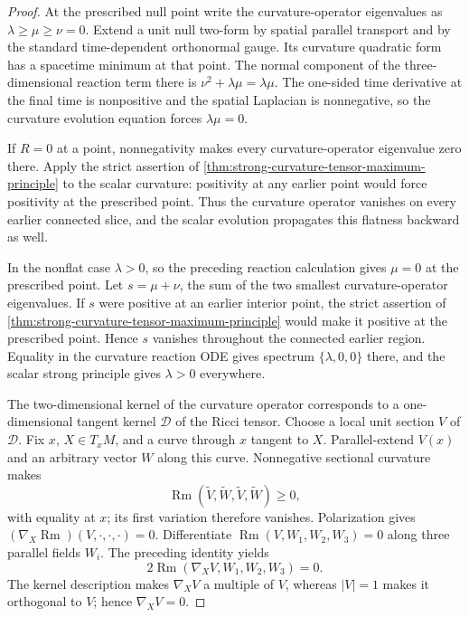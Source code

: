 \begin{proof}
At the prescribed null point write the curvature-operator eigenvalues as
$\lambda\ge\mu\ge\nu=0$.  Extend a unit null two-form by spatial parallel
transport and by the standard time-dependent orthonormal gauge.  Its
curvature quadratic form has a spacetime minimum at that point.  The normal
component of the three-dimensional reaction term there is
$\nu^2+\lambda\mu=\lambda\mu$.  The one-sided time derivative at the final
time is nonpositive and the spatial Laplacian is nonnegative, so the
curvature evolution equation forces $\lambda\mu=0$.

If $R=0$ at a point, nonnegativity makes every curvature-operator eigenvalue
zero there.  Apply the strict assertion of
\ref{thm:strong-curvature-tensor-maximum-principle} to the scalar curvature:
positivity at any earlier point would force positivity at the prescribed
point.  Thus the curvature operator vanishes on every earlier connected
slice, and the scalar evolution propagates this flatness backward as well.

In the nonflat case $\lambda>0$, so the preceding reaction calculation gives
$\mu=0$ at the prescribed point.  Let $s=\mu+\nu$, the sum of the two
smallest curvature-operator eigenvalues.  If $s$ were positive at an earlier
interior point, the strict assertion of
\ref{thm:strong-curvature-tensor-maximum-principle} would make it positive at
the prescribed point.  Hence $s$ vanishes throughout the connected earlier
region.  Equality in the curvature reaction ODE gives spectrum
$\{\lambda,0,0\}$ there, and the scalar strong principle gives
$\lambda>0$ everywhere.

The two-dimensional kernel of the curvature operator corresponds to a
one-dimensional tangent kernel $\mathcal D$ of the Ricci tensor.  Choose a
local unit section $V$ of $\mathcal D$.  Fix $x$, $X\in T_xM$, and a curve
through $x$ tangent to $X$.  Parallel-extend $V(x)$ and an arbitrary vector
$W$ along this curve.  Nonnegative sectional curvature makes
\[
 \operatorname{Rm}(\widetilde V,\widetilde W,
                        \widetilde V,\widetilde W)\ge0,
\]
with equality at $x$; its first variation therefore vanishes.  Polarization
gives
$(\nabla_X\operatorname{Rm})(V,\cdot,\cdot,\cdot)=0$.
Differentiate
$\operatorname{Rm}(V,W_1,W_2,W_3)=0$ along three parallel fields $W_i$.
The preceding identity yields
\[
 2\operatorname{Rm}(\nabla_XV,W_1,W_2,W_3)=0.
\]
The kernel description makes $\nabla_XV$ a multiple of $V$, whereas
$|V|=1$ makes it orthogonal to $V$; hence $\nabla_XV=0$.


\end{proof}
